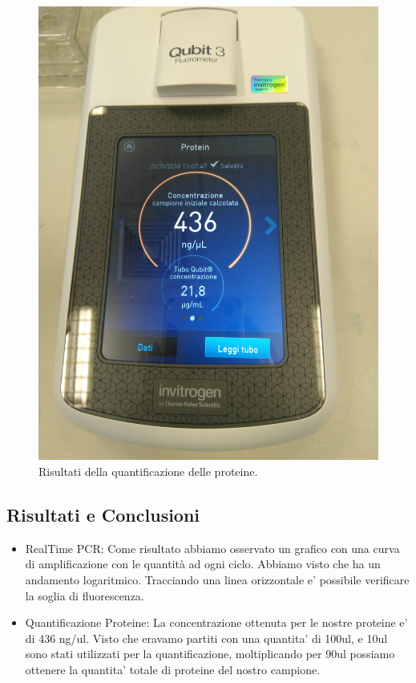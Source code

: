 \begin{figure}
  \includegraphics[width=\linewidth]{./immagini/qubit3.jpg}
  \caption{Risultati della quantificazione delle proteine.}
  \label{fig:qubit3}
\end{figure}

\subsection{Risultati e Conclusioni}

\begin{itemize}
\item RealTime PCR:
Come risultato abbiamo osservato un grafico con una curva di amplificazione 
con le quantit\`a ad ogni ciclo.
Abbiamo visto che ha un andamento logaritmico.
Tracciando una linea orizzontale e' possibile verificare la soglia di fluorescenza.\\

\item Quantificazione Proteine:
La concentrazione ottenuta per le nostre proteine e' di 436 ng/ul. Visto che eravamo partiti con una
quantita' di 100ul, e 10ul sono stati utilizzati per la quantificazione, moltiplicando per 90ul possiamo
ottenere la quantita' totale di proteine del nostro campione.
\end{itemize}
